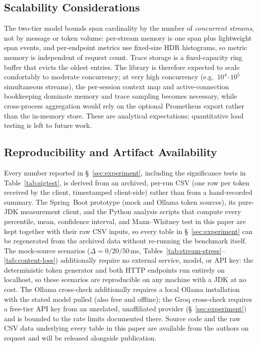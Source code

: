 \documentclass[11pt]{article}
\begin{document}
\subsection{Scalability Considerations}
\label{sec:scalability}
The two-tier model bounds span cardinality by the number of \emph{concurrent streams}, not by message or token volume: per-stream memory is one span plus lightweight span events, and per-endpoint metrics use fixed-size HDR histograms, so metric memory is independent of request count. Trace storage is a fixed-capacity ring buffer that evicts the oldest entries. The library is therefore expected to scale comfortably to moderate concurrency; at very high concurrency (e.g.\ $10^4$--$10^5$ simultaneous streams), the per-session context map and active-connection bookkeeping dominate memory and trace sampling becomes necessary, while cross-process aggregation would rely on the optional Prometheus export rather than the in-memory store. These are analytical expectations; quantitative load testing is left to future work.

\subsection{Reproducibility and Artifact Availability}
\label{sec:artifact}
Every number reported in \S~\ref{sec:experiment}, including the significance tests in Table~\ref{tab:sigtest}, is derived from an archived, per-run CSV (one row per token received by the client, timestamped client-side) rather than from a hand-recorded summary. The Spring~Boot prototype (mock and Ollama token sources), its pure-JDK measurement client, and the Python analysis scripts that compute every percentile, mean, confidence interval, and Mann--Whitney test in this paper are kept together with their raw CSV inputs, so every table in \S~\ref{sec:experiment} can be regenerated from the archived data without re-running the benchmark itself. The mock-source scenarios ($\Delta=0/20/50$\,ms, Tables~\ref{tab:stream-stress}--\ref{tab:content-loss}) additionally require no external service, model, or API key: the deterministic token generator and both HTTP endpoints run entirely on localhost, so these scenarios are reproducible on any machine with a JDK at no cost. The Ollama cross-check additionally requires a local Ollama installation with the stated model pulled (also free and offline); the Groq cross-check requires a free-tier API key from an unrelated, unaffiliated provider (\S~\ref{sec:experiment}) and is bounded to the rate limits documented there. Source code and the raw CSV data underlying every table in this paper are available from the authors on request and will be released alongside publication.
\end{document}
